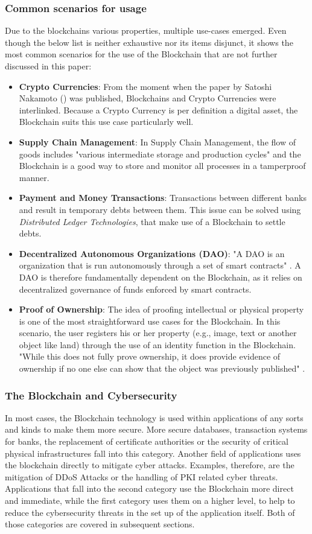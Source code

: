 \subsubsection{Common scenarios for usage}
Due to the blockchains various properties, multiple use-cases emerged. Even though the below list is neither exhaustive nor its items disjunct, it shows the most common scenarios for the use of the Blockchain\cite{Wust2017} that are not further discussed in this paper:
\begin{itemize}
  \item \textbf{Crypto Currencies}: From the moment when the paper by Satoshi Nakamoto (\cite{Nakamoto2009}) was published, Blockchains and Crypto Currencies were interlinked. Because a Crypto Currency is per definition a digital asset, the Blockchain suits this use case particularly well.
  \item \textbf{Supply Chain Management}: In Supply Chain Management, the flow of goods includes "various intermediate storage and production cycles" \cite{Wust2017} and the Blockchain is a good way to store and monitor all processes in a tamperproof manner.
  \item \textbf{Payment and Money Transactions}: Transactions between different banks and result in temporary debts between them. This issue can be solved using \textit{Distributed Ledger Technologies}, that make use of a Blockchain to settle debts.
  \item \textbf{Decentralized Autonomous Organizations (DAO)}: "A DAO is an organization that is run autonomously through a set of smart contracts" \cite{Wust2017}. A DAO is therefore fundamentally dependent on the Blockchain, as it relies on decentralized governance of funds enforced by smart contracts.
  \item \textbf{Proof of Ownership}: The idea of proofing intellectual or physical property is one of the most straightforward use cases for the Blockchain. In this scenario, the user registers his or her property (e.g., image, text or another object like land) through the use of an identity function in the Blockchain. "While this does not fully prove ownership, it does provide evidence of ownership if no one else can show that the object was previously published" \cite{Wust2017}.
\end{itemize}

\subsubsection{The Blockchain and Cybersecurity}
In most cases, the Blockchain technology is used within applications of any sorts and kinds to make them more secure. More secure databases, transaction systems for banks, the replacement of certificate authorities or the security of critical physical infrastructures fall into this category. Another field of applications uses the blockchain directly to mitigate cyber attacks. Examples, therefore, are the mitigation of DDoS Attacks or the handling of PKI related cyber threats. Applications that fall into the second category use the Blockchain more direct and immediate, while the first category uses them on a higher level, to help to reduce the cybersecurity threats in the set up of the application itself. Both of those categories are covered in subsequent sections.
